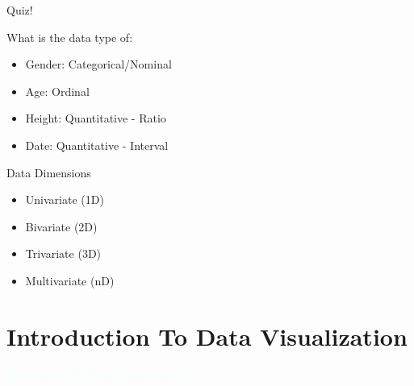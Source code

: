 \documentclass{beamer}
\newcommand{\thblue}[1]{{\Huge {\textcolor{azure}{#1}}}}
\newcommand{\mypause}{\pause}
\begin{document}
\begin{frame}{Quiz!} 

    What is the data type of:
    \begin{itemize}
        \item Gender: \mypause Categorical/Nominal
        \item Age: \mypause Ordinal
        \item Height: \mypause Quantitative - Ratio 
        \item Date: \mypause Quantitative - Interval
    \end{itemize}
\end{frame}  


\begin{frame}{Data Dimensions} 
    \begin{itemize}
        \item Univariate (1D)
        \item Bivariate (2D)
        \item Trivariate (3D)
        \item Multivariate (nD)
    \end{itemize}
\end{frame}  

\section{Introduction To Data Visualization}
\begin{frame}{}                                                                                                              
    \begin{center}                                                                                                           
        \thblue{Introduction To Data Visualization}                                                                         
    \end{center}                                                                                                             
\end{frame}                                                                                                                  
\end{document}
